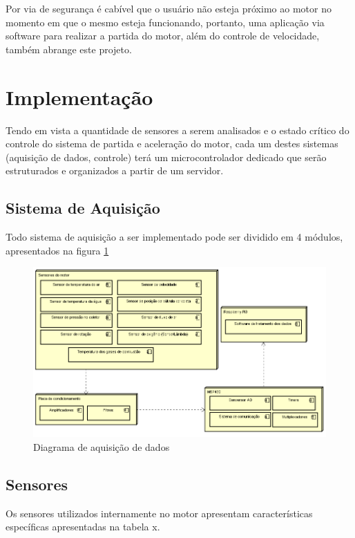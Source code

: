 Por via de segurança é cabível que o usuário não esteja próximo ao motor no momento em que o mesmo esteja funcionando, portanto, uma aplicação via software para realizar a partida do motor, além do controle de velocidade, também abrange este projeto.

\section{Implementação}

Tendo em vista a quantidade de sensores a serem analisados e o estado crítico do controle do sistema de partida e aceleração do motor, cada um destes sistemas (aquisição de dados, controle) terá um microcontrolador dedicado que serão estruturados e organizados a partir de um servidor.

\subsection{Sistema de Aquisição}

Todo sistema de aquisição a ser implementado pode ser dividido em 4 módulos, apresentados na figura \ref{diagramaDeAquisicaoDeDados}

\begin{figure}[h!]
	\centering
	\includegraphics[keepaspectratio=true,scale= 0.7]{figuras/Diagrama.PNG}
	\caption{Diagrama de aquisição de dados}
	\label{diagramaDeAquisicaoDeDados}
\end{figure}

\subsection{Sensores}

Os sensores utilizados internamente no motor apresentam características específicas apresentadas na tabela x.
